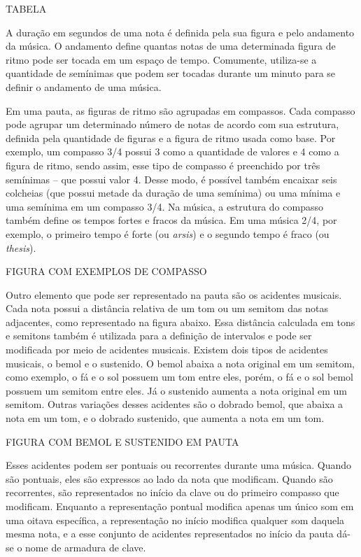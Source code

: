       TABELA

      A duração em segundos de uma nota é definida pela sua figura e pelo andamento da música. O andamento define quantas notas de uma determinada figura de ritmo pode ser tocada em um espaço de tempo. Comumente, utiliza-se a quantidade de semínimas que podem ser tocadas durante um minuto para se definir o andamento de uma música.

      Em uma pauta, as figuras de ritmo são agrupadas em compassos. Cada compasso pode agrupar um determinado número de notas de acordo com sua estrutura, definida pela quantidade de figuras e a figura de ritmo usada como base. Por exemplo, um compasso 3/4 possui 3 como a quantidade de valores e 4 como a figura de ritmo, sendo assim, esse tipo de compasso é preenchido por três semínimas -- que possui valor 4. Desse modo, é possível também encaixar seis colcheias (que possui metade da duração de uma semínima) ou uma mínima e uma semínima em um compasso 3/4. Na música, a estrutura do compasso também define os tempos fortes e fracos da música. Em uma música 2/4, por exemplo, o primeiro tempo é forte (ou \textit{arsis}) e o segundo tempo é fraco (ou \textit{thesis}).

      FIGURA COM EXEMPLOS DE COMPASSO

      Outro elemento que pode ser representado na pauta são os acidentes musicais. Cada nota possui a distância relativa de um tom ou um semitom das notas adjacentes, como representado na figura abaixo. Essa distância calculada em tons e semitons também é utilizada para a definição de intervalos e pode ser modificada por meio de acidentes musicais. Existem dois tipos de acidentes musicais, o bemol e o sustenido. O bemol abaixa a nota original em um semitom, como exemplo, o fá e o sol possuem um tom entre eles, porém, o fá e o sol bemol possuem um semitom entre eles. Já o sustenido aumenta a nota original em um semitom. Outras variações desses acidentes são o dobrado bemol, que abaixa a nota em um tom, e o dobrado sustenido, que aumenta a nota em um tom.

      FIGURA COM BEMOL E SUSTENIDO EM PAUTA

      Esses acidentes podem ser pontuais ou recorrentes durante uma música. Quando são pontuais, eles são expressos ao lado da nota que modificam. Quando são recorrentes, são representados no início da clave ou do primeiro compasso que modificam. Enquanto a representação pontual modifica apenas um único som em uma oitava específica, a representação no início modifica qualquer som daquela mesma nota, e a esse conjunto de acidentes representados no início da pauta dá-se o nome de armadura de clave.

